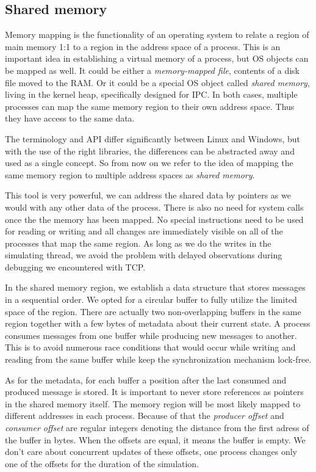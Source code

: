 \subsection{Shared memory}

Memory mapping is the functionality of an operating system to relate a region of main memory 1:1 to a region in the address space of a process. This is an important idea in establishing a virtual memory of a process, but OS objects can be mapped as well. It could be either a \textit{memory-mapped file}, contents of a disk file moved to the RAM. Or it could be a special OS object called \textit{shared memory}, living in the kernel heap, specifically designed for IPC. In both cases, multiple processes can map the same memory region to their own address space. Thus they have access to the same data.

The terminology and API differ significantly between Linux and Windows, but with the use of the right libraries, the differences can be abstracted away and used as a single concept. So from now on we refer to the idea of mapping the same memory region to multiple address spaces as \textit{shared memory}.

This tool is very powerful, we can address the shared data by pointers as we would with any other data of the process. There is also no need for system calls once the the memory has been mapped. No special instructions need to be used for reading or writing and all changes are immediately visible on all of the processes that map the same region. As long as we do the writes in the simulating thread, we avoid the problem with delayed observations during debugging we encountered with TCP.

In the shared memory region, we establish a data structure that stores messages in a sequential order. We opted for a circular buffer to fully utilize the limited space of the region. There are actually two non-overlapping buffers in the same region together with a few bytes of metadata about their current state. A process consumes messages from one buffer while producing new messages to another. This is to avoid numerous race conditions that would occur while writing and reading from the same buffer while keep the synchronization mechanism lock-free.

As for the metadata, for each buffer a position after the last consumed and produced message is stored. It is important to never store references as pointers in the shared memory itself. The memory region will be most likely mapped to different addresses in each process. Because of that the \textit{producer offset} and \textit{consumer offset} are regular integers denoting the distance from the first adress of the buffer in bytes. When the offsets are equal, it means the buffer is empty. We don't care about concurrent updates of these offsets, one process changes only one of the offsets for the duration of the simulation.

